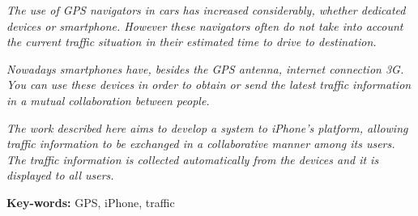 \emph{The use of GPS navigators in cars has increased considerably, whether dedicated devices or smartphone. However these navigators often do not take into account the current traffic situation in their estimated time to drive to destination.}

\emph{Nowadays smartphones have, besides the GPS antenna, internet connection 3G. You can use these devices in order to obtain or send the latest traffic information in a mutual collaboration between people.}

\emph{The work described here aims to develop a system to iPhone's platform, allowing traffic information to be exchanged in a collaborative manner among its users. The traffic information is collected automatically from the devices and it is displayed to all users.}




  
\textbf{Key-words:} GPS, iPhone, traffic